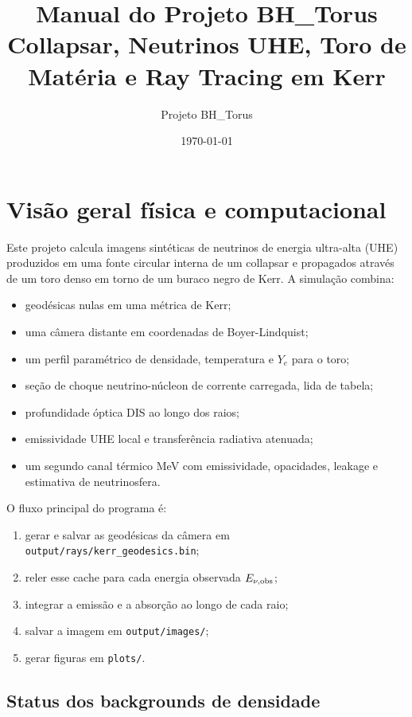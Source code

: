 \documentclass[11pt,a4paper]{article}
\title{Manual do Projeto BH\_Torus\\
\large Collapsar, Neutrinos UHE, Toro de Matéria e Ray Tracing em Kerr}
\author{Projeto BH\_Torus}
\date{\today}
\begin{document}
\maketitle
\tableofcontents
\newpage

\section{Visão geral física e computacional}

Este projeto calcula imagens sintéticas de neutrinos de energia ultra-alta
(UHE) produzidos em uma fonte circular interna de um collapsar e propagados
através de um toro denso em torno de um buraco negro de Kerr. A simulação
combina:

\begin{itemize}
  \item geodésicas nulas em uma métrica de Kerr;
  \item uma câmera distante em coordenadas de Boyer-Lindquist;
  \item um perfil paramétrico de densidade, temperatura e $Y_e$ para o toro;
  \item seção de choque neutrino-núcleon de corrente carregada, lida de tabela;
  \item profundidade óptica DIS ao longo dos raios;
  \item emissividade UHE local e transferência radiativa atenuada;
  \item um segundo canal térmico MeV com emissividade, opacidades,
  leakage e estimativa de neutrinosfera.
\end{itemize}

O fluxo principal do programa é:

\begin{enumerate}
  \item gerar e salvar as geodésicas da câmera em
  \texttt{output/rays/kerr\_geodesics.bin};
  \item reler esse cache para cada energia observada $E_{\nu,\rm obs}$;
  \item integrar a emissão e a absorção ao longo de cada raio;
  \item salvar a imagem em \texttt{output/images/};
  \item gerar figuras em \texttt{plots/}.
\end{enumerate}

\subsection*{Status dos backgrounds de densidade}
\end{document}
